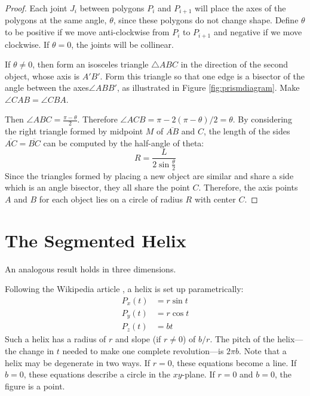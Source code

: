 \documentclass[11pt]{article}
\begin{document}
{\begin{proof}

Each joint $J_i$ between polygons $P_i$ and $P_{i+1}$ will place the axes of the polygons at the same angle, $\theta$, since
these polygons do not change shape. Define $\theta$ to be positive
if we move anti-clockwise from $P_i$ to $P_{i+1}$ and negative if we move clockwise.
If $\theta = 0$, the joints will be collinear.

If $\theta \neq 0$, then form an isosceles triangle $\triangle{ABC}$ in the direction of the second
object, whose axis is $A'B'$.
Form this triangle so that one edge is a bisector of the angle between the axes$\angle ABB'$,
as illustrated in Figure \ref{fig:prismdiagram}.
Make $\angle CAB = \angle CBA$.

Then $\angle ABC = \frac{\pi - \theta}{2}$. Therefore $\angle ACB = \pi - 2(\pi-\theta)/2 = \theta$.
By considering the right triangle formed by midpoint $M$ of $\overline{AB}$ and $C$,
the length of the sides $\overline{AC} = \overline{BC}$ can be computed by the half-angle
of theta:
\[
R = \frac{L}{2 \sin{\frac{\theta}{2}}}
\]
Since the triangles formed by placing a new object are similar and share a side which
is an angle bisector, they all share the point $C$. Therefore, the axis points $A$ and $B$
for each object lies on a circle of radius $R$ with center $C$.
\end{proof}


\label{sec:2d}

\section{The Segmented Helix}

An analogous result holds in three dimensions.

Following the Wikipedia article \cite{wiki:helix},
a helix is set up parametrically:
\begin{align}
    P_x(t) &= r \sin{t}  \\
    P_y(t) &= r \cos{t} \\
   P_z(t) &= b t
\end{align}
Such a helix has a radius of $r$ and slope (if $r \neq 0$) of $b/r$.
The pitch of the helix---the change in $t$ needed to make one complete revolution---is $2\pi b$.
Note that a helix may be degenerate in two ways.
If $r = 0$, these equations become a line. If $b = 0$, these equations describe a circle in the $xy$-plane.
If $r = 0$ and $b = 0$, the figure is a point.

}
\end{document}
